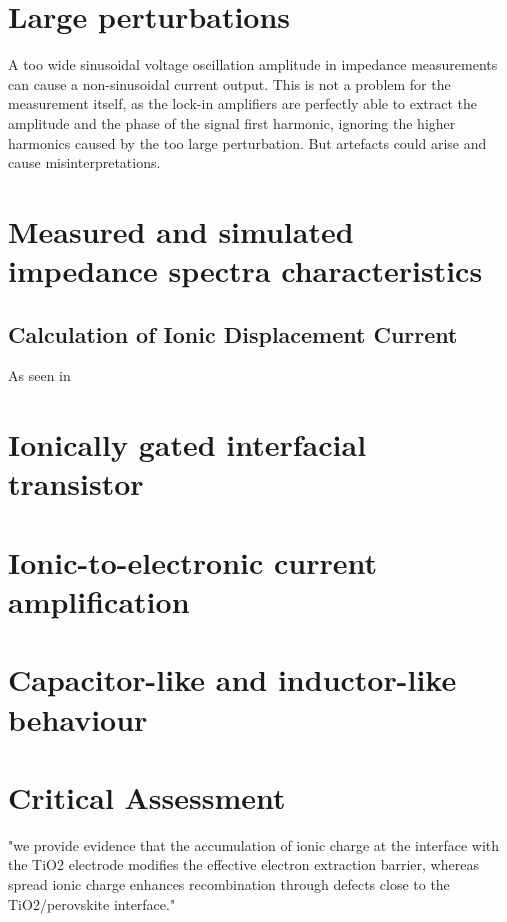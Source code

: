 \section{Large perturbations}\label{impedance-large_perturbations}

	A too wide sinusoidal voltage oscillation amplitude in impedance measurements can cause a non-sinusoidal current output.
	This is not a problem for the measurement itself, as the lock-in amplifiers are perfectly able to extract the amplitude and the phase of the signal first harmonic, ignoring the higher harmonics caused by the too large perturbation.
	But artefacts could arise and cause misinterpretations.


\section{Measured and simulated impedance spectra characteristics}

	\subsection{Calculation of Ionic Displacement Current}\label{displacement_current_ionic}
		As seen in 



\section{Ionically gated interfacial transistor}


\section{Ionic-to-electronic current amplification}
\section{Capacitor-like and inductor-like behaviour}
\section{Critical Assessment}

	"we provide evidence that the accumulation of ionic charge at the interface with the TiO2 electrode modifies the effective electron extraction barrier, whereas spread ionic charge enhances recombination through defects close to the TiO2/perovskite interface." \cite{Tress2016}

